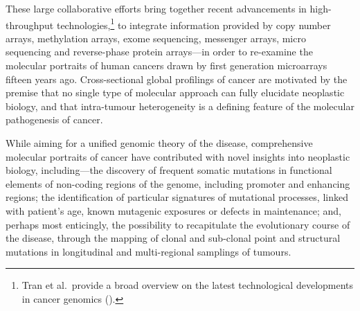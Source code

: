 
These %
large collaborative efforts bring together recent advancements in
high-throughput technologies,\footnote{Tran et al.~provide a broad overview on
  the latest technological developments in cancer genomics
  (\citealp{tran_cancer_2012}).} %
to integrate information provided by  copy number arrays,
 methylation arrays, exome sequencing, messenger 
arrays, micro sequencing and reverse-phase protein arrays---in
order to re-examine the molecular portraits of human cancers drawn by first
generation microarrays fifteen years ago.  Cross-sectional global profilings of
cancer are motivated by the premise that no single type of molecular approach
can fully elucidate neoplastic biology,\cite{hanash_integrated_2004} and that
intra-tumour heterogeneity is a defining feature of the molecular pathogenesis
of cancer.\cite{yates_evolution_2012,almendro_cellular_2013}

While aiming for a unified genomic theory of the disease, comprehensive
molecular portraits of cancer have contributed with novel insights into
neoplastic biology, including---the discovery of frequent somatic mutations in
functional elements of non-coding regions of the genome, including promoter and
enhancing regions;\cite{horn_tert_2013,huang_highly_2013} the identification of
particular signatures of mutational processes, linked with patient's age, known
mutagenic exposures or defects in 
maintenance;\cite{nik-zainal_mutational_2012} and, perhaps most enticingly, the
possibility to recapitulate the evolutionary course of the disease, through the
mapping of clonal and sub-clonal point and structural mutations in longitudinal
and multi-regional samplings of tumours.\cite{watson_emerging_2013}

